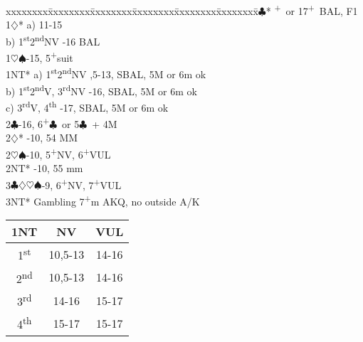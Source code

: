 \documentclass[10pt]{article}
\renewcommand{\c}{$\clubsuit$}
\renewcommand{\d}{$\diamondsuit$}
\newcommand{\h}{$\heartsuit$}
\newcommand{\s}{$\spadesuit$}
\newcommand{\p}{\textsuperscript{+}}
\newcommand{\sth}{1\textsuperscript{st}}
\newcommand{\ndh}{2\textsuperscript{nd}}
\newcommand{\rdh}{3\textsuperscript{rd}}
\newcommand{\thh}{4\textsuperscript{th}}
\newenvironment{bidtable}[1][]
{\textbf{#1}
  \begin{adjustwidth}{1em}{}
    \addvspace{2pt}
    \begin{tabbing}
      xxxxxxxx\=xxxxxxxx\=xxxxxxxx\=xxxxxxxx\=xxxxxxxx\=xxxxxxxx\=\kill}
{\end{tabbing}\end{adjustwidth}\bigskip}%
\begin{document}
\begin{multicols*}{2}
\begin{bidtable}
1\c*       {}\p\ or 17\p\ BAL, F1                         \\
1\d*       \> a) 11-15                                                   \\
       \> b) \sth \ndh NV         \>  -16 BAL                   \\
1\h\s      {}-15, 5\p suit                                            \\
1NT*       \> a) \sth \ndh NV         \>  ,5-13, SBAL, 5M or 6m ok \\
           \> b) \sth \ndh V, \rdh NV \>  -16, SBAL, 5M or 6m ok   \\
           \> c) \rdh V, \thh         \>  -17, SBAL, 5M or 6m ok   \\
2\c        {}-16, 6\p\c\ or 5\c\ + 4M                                \\
2\d*       {}-10, 54 MM                                                \\
2\h\s      {}-10, 5\p NV, 6\p VUL                                      \\
2NT*       -10, 55 mm                                                \\
3\c\d\h\s  {}-9, 6\p NV, 7\p VUL                                       \\
3NT*       \> Gambling 7\p m AKQ, no outside A/K
\end{bidtable}

\begin{tabular}{c|c|c}
  1NT & NV      & VUL   \\
  \hline
  \sth & 10,5-13 & 14-16 \\
  \ndh & 10,5-13 & 14-16 \\
  \rdh & 14-16   & 15-17 \\
  \thh & 15-17   & 15-17
\end{tabular}



\end{multicols*}
\end{document}
